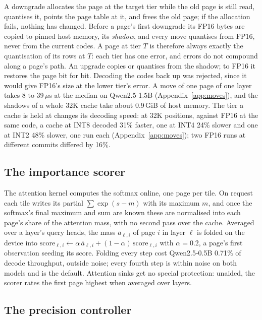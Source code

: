 \documentclass{article}
\begin{document}
A downgrade allocates the page at the target tier while the old page is still
read, quantises it, points the page table at it, and frees the old page; if
the allocation fails, nothing has changed. Before a page's first downgrade its
FP16 bytes are copied to pinned host memory, its \textit{shadow}, and every
move quantises from FP16, never from the current codes. A page at tier $T$ is
therefore always exactly the quantisation of its rows at $T$: each tier has one
error, and errors do not compound along a page's path. An upgrade copies or
quantises from the shadow; to FP16 it restores the page bit for bit. Decoding
the codes back up was rejected, since it would give FP16's size at the lower
tier's error. A move of one page of one layer takes 8 to 39\,$\mu$s at the
median on Qwen2.5-1.5B (Appendix~\ref{app:moves}), and the shadows of a whole
32K cache take about 0.9\,GiB of host memory. The tier a cache is held at
changes its decoding speed: at 32K positions, against FP16 at the same code, a
cache at INT8 decoded 31\% faster, one at INT4 24\% slower and one at INT2 48\%
slower, one run each (Appendix~\ref{app:moves}); two FP16 runs at different
commits differed by 16\%.

\subsection{The importance scorer}
\label{sec:scorer}

The attention kernel computes the softmax online, one page per tile. On
request each tile writes its partial $\sum \exp(s - m)$ with its maximum $m$,
and once the softmax's final maximum and sum are known these are normalised
into each page's share of the attention mass, with no second pass over the
cache. Averaged over a layer's query heads, the mass $\bar a_{\ell,i}$ of page
$i$ in layer $\ell$ is folded on the device into
$\mathrm{score}_{\ell,i} \leftarrow \alpha\,\bar a_{\ell,i} + (1-\alpha)\,
\mathrm{score}_{\ell,i}$ with $\alpha = 0.2$, a page's first observation
seeding its score. Folding every step cost Qwen2.5-0.5B 0.71\% of decode
throughput, outside noise; every fourth step is within noise on both models and
is the default. Attention sinks get no special protection: unaided, the scorer
rates the first page highest when averaged over layers.

\subsection{The precision controller}
\label{sec:controller}
\end{document}
